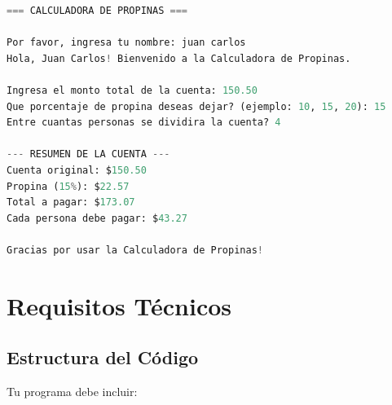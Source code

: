 \documentclass[12pt,a4paper]{article}
\begin{document}
\begin{lstlisting}[language=Python, caption=Ejemplo de ejecución del programa]
=== CALCULADORA DE PROPINAS ===

Por favor, ingresa tu nombre: juan carlos
Hola, Juan Carlos! Bienvenido a la Calculadora de Propinas.

Ingresa el monto total de la cuenta: 150.50
Que porcentaje de propina deseas dejar? (ejemplo: 10, 15, 20): 15
Entre cuantas personas se dividira la cuenta? 4

--- RESUMEN DE LA CUENTA ---
Cuenta original: $150.50
Propina (15%): $22.57
Total a pagar: $173.07
Cada persona debe pagar: $43.27

Gracias por usar la Calculadora de Propinas!
\end{lstlisting}

\section{Requisitos Técnicos}

\subsection{Estructura del Código}

Tu programa debe incluir:
\end{document}
